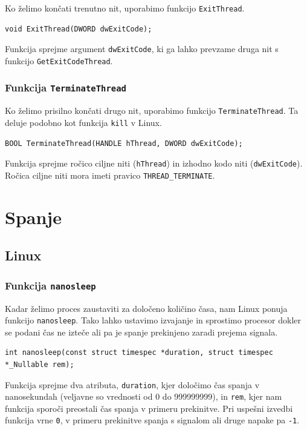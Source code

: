 \documentclass[a4paper,12pt,openright]{book}
\begin{document}
Ko želimo končati trenutno nit, uporabimo funkcijo \texttt{ExitThread}.

\begin{lstlisting}[style=func]
 void ExitThread(DWORD dwExitCode);
\end{lstlisting}

Funkcija sprejme argument \texttt{dwExitCode}, ki ga lahko prevzame druga nit s funkcijo \texttt{GetExitCodeThread}.

\subsubsection{Funkcija \texttt{TerminateThread}}

Ko želimo prisilno končati drugo nit, uporabimo funkcijo \texttt{TerminateThread}.
Ta deluje podobno kot funkcija \texttt{kill} v Linux.

\begin{lstlisting}[style=func]
 BOOL TerminateThread(HANDLE hThread, DWORD dwExitCode);
\end{lstlisting}

Funkcija sprejme ročico ciljne niti (\texttt{hThread}) in izhodno kodo niti (\texttt{dwExit\-Code}).
Ročica ciljne niti mora imeti pravico \texttt{THREAD\_TERMINATE}.

\section{Spanje}

\subsection{Linux}

\subsubsection{Funkcija \texttt{nanosleep}}

Kadar želimo proces zaustaviti za določeno količino časa, nam Linux ponuja funkcijo \texttt{nanosleep}.
Tako lahko ustavimo izvajanje in sprostimo procesor dokler se podani čas ne izteče ali pa je spanje prekinjeno zaradi prejema signala.

\begin{lstlisting}[style=func]
 int nanosleep(const struct timespec *duration, struct timespec *_Nullable rem);
\end{lstlisting}

Funkcija sprejme dva atributa, \texttt{duration}, kjer določimo čas spanja v nanosekundah (veljavne so vrednosti od 0 do 999999999), in \texttt{rem}, kjer nam funkcija sporoči preostali čas spanja v primeru prekinitve.
Pri uspešni izvedbi funkcija vrne \texttt{0}, v primeru prekinitve spanja s signalom ali druge napake pa \texttt{-1}.
\end{document}
